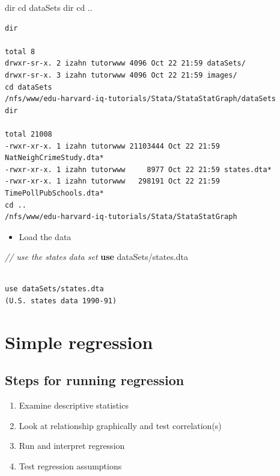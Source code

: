 \documentclass[
]{book}
\newenvironment{Shaded}{\begin{snugshade}}{\end{snugshade}}
\newcommand{\CommentTok}[1]{\textcolor[rgb]{0.56,0.35,0.01}{\textit{#1}}}
\newcommand{\KeywordTok}[1]{\textcolor[rgb]{0.13,0.29,0.53}{\textbf{#1}}}
\newcommand{\NormalTok}[1]{#1}
\newcommand{\OtherTok}[1]{\textcolor[rgb]{0.56,0.35,0.01}{#1}}
\providecommand{\tightlist}{%
  \setlength{\itemsep}{0pt}\setlength{\parskip}{0pt}}
\begin{document}
\begin{Shaded}
\begin{Highlighting}[]
  \OtherTok{dir}
\NormalTok{  cd dataSets}
  \OtherTok{dir}
\NormalTok{  cd ..}
\end{Highlighting}
\end{Shaded}

\begin{verbatim}
dir

total 8
drwxr-sr-x. 2 izahn tutorwww 4096 Oct 22 21:59 dataSets/
drwxr-sr-x. 3 izahn tutorwww 4096 Oct 22 21:59 images/
cd dataSets
/nfs/www/edu-harvard-iq-tutorials/Stata/StataStatGraph/dataSets
dir

total 21008
-rwxr-xr-x. 1 izahn tutorwww 21103444 Oct 22 21:59 NatNeighCrimeStudy.dta*
-rwxr-xr-x. 1 izahn tutorwww     8977 Oct 22 21:59 states.dta*
-rwxr-xr-x. 1 izahn tutorwww   298191 Oct 22 21:59 TimePollPubSchools.dta*
cd ..
/nfs/www/edu-harvard-iq-tutorials/Stata/StataStatGraph
\end{verbatim}

\begin{itemize}
\tightlist
\item
  Load the data
\end{itemize}

\begin{Shaded}
\begin{Highlighting}[]
  \CommentTok{// use the states data set}
  \KeywordTok{use}\NormalTok{ dataSets/states.dta}
\end{Highlighting}
\end{Shaded}

\begin{verbatim}

use dataSets/states.dta
(U.S. states data 1990-91)
\end{verbatim}

\hypertarget{simple-regression}{%
\section{Simple regression}\label{simple-regression}}

\hypertarget{steps-for-running-regression}{%
\subsection{Steps for running regression}\label{steps-for-running-regression}}

\begin{enumerate}
\def\labelenumi{\arabic{enumi}.}
\tightlist
\item
  Examine descriptive statistics
\item
  Look at relationship graphically and test correlation(s)
\item
  Run and interpret regression
\item
  Test regression assumptions
\end{enumerate}
\end{document}
